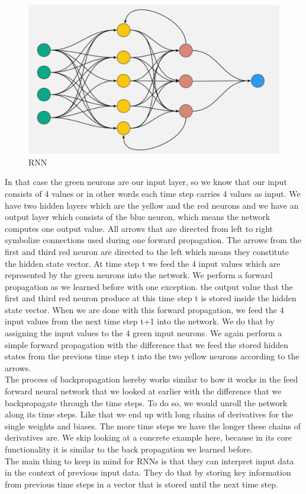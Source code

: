 \documentclass[a4paper,12pt]{report}
\begin{document}
	\begin{figure}[htbp]
  \centering
  \includegraphics[width=\textwidth]{images/RNN.png}
  \caption{RNN}
  \label{fig:fullwidth}
\end{figure}
	
	
	In that case the green neurons are our input layer, so we know that our input consists of 4 values or in other words each time step carries 4 values as input. We have two hidden layers which are the yellow and the red neurons and we have an output layer which consists of the blue neuron, which means the network computes one output value. All arrows that are directed from left to right symbolize connections used during one forward propagation. The arrows from the first and third red neuron are directed to the left which means they constitute the hidden state vector. At time step t we feed the 4 input values which are represented by the green neurons into the network. We perform a forward propagation as we learned before with one exception. the output value that the first and third red neuron produce at this time step t is stored inside the hidden state vector. When we are done with this forward propagation, we feed the 4 input values from the next time step t+1 into the network. We do that by assigning the input values to the 4 green input neurons. We again perform a simple forward propagation with the difference that we feed the stored hidden states from the previous time step t into the two yellow neurons according to the arrows.\\
	The process of backpropagation hereby works similar to how it works in the feed forward neural network that we looked at earlier with the difference that we backpropagate through the time steps. To do so, we would unroll the network along its time steps. Like that we end up with long chains of derivatives for the single weights and biases. The more time steps we have the longer these chains of derivatives are. We skip looking at a concrete example here, because in its core functionality it is similar to the back propagation we learned before. \\
	The main thing to keep in mind for RNNs is that they can interpret input data in the context of previous input data. They do that by storing key information from previous time steps in a vector that is stored until the next time step.
	
\end{document}
